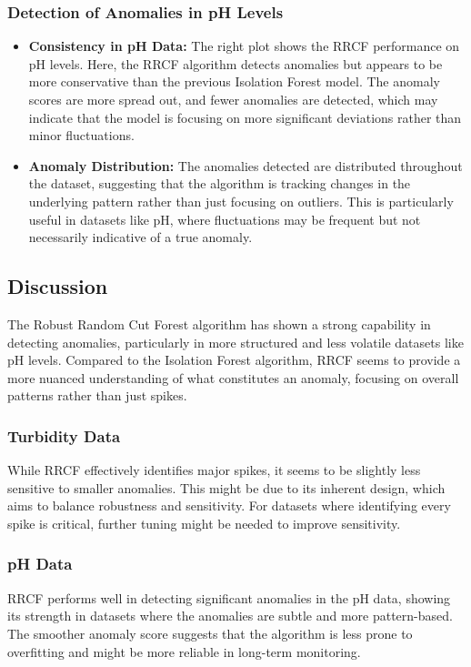 \documentclass[12pt]{report}
\begin{document}
\subsubsection{Detection of Anomalies in pH Levels}
\begin{itemize}
    \item \textbf{Consistency in pH Data:} The right plot shows the RRCF performance on pH levels. Here, the RRCF algorithm detects anomalies but appears to be more conservative than the previous Isolation Forest model. The anomaly scores are more spread out, and fewer anomalies are detected, which may indicate that the model is focusing on more significant deviations rather than minor fluctuations.
    \item \textbf{Anomaly Distribution:} The anomalies detected are distributed throughout the dataset, suggesting that the algorithm is tracking changes in the underlying pattern rather than just focusing on outliers. This is particularly useful in datasets like pH, where fluctuations may be frequent but not necessarily indicative of a true anomaly.
\end{itemize}

\subsection{Discussion}

The Robust Random Cut Forest algorithm has shown a strong capability in detecting anomalies, particularly in more structured and less volatile datasets like pH levels. Compared to the Isolation Forest algorithm, RRCF seems to provide a more nuanced understanding of what constitutes an anomaly, focusing on overall patterns rather than just spikes.

\subsubsection{Turbidity Data}
While RRCF effectively identifies major spikes, it seems to be slightly less sensitive to smaller anomalies. This might be due to its inherent design, which aims to balance robustness and sensitivity. For datasets where identifying every spike is critical, further tuning might be needed to improve sensitivity.

\subsubsection{pH Data}
RRCF performs well in detecting significant anomalies in the pH data, showing its strength in datasets where the anomalies are subtle and more pattern-based. The smoother anomaly score suggests that the algorithm is less prone to overfitting and might be more reliable in long-term monitoring.
\end{document}
